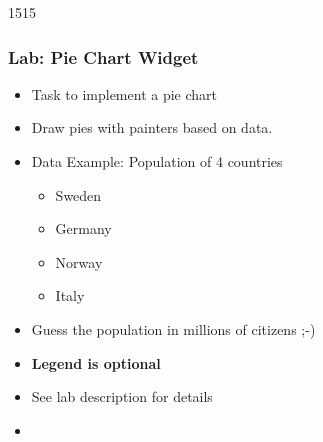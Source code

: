 \begin{slide}{1515}\frametitle{Lab: Pie Chart Widget}
  \begin{itemize}
  \item Task to implement a pie chart
  \item Draw pies with painters based on data.
  \item Data Example: Population of 4 countries
    \begin{itemize}
    \item Sweden
    \item Germany
    \item Norway
    \item Italy
   \end{itemize}
  \item Guess the population in millions of citizens ;-)
  \item \textbf{Legend is optional}
  \item See lab description for details
  \item[] 
  \end{itemize}
\end{slide}
